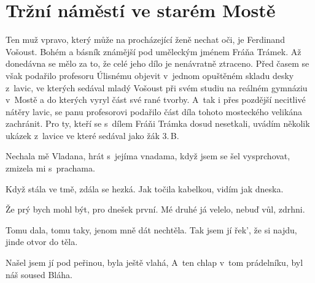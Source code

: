 
\chapter{Tržní náměstí ve starém Mostě}

Ten muž vpravo, který může na procházející ženě nechat oči, je Ferdinand
Vošoust. Bohém a básník známější pod uměleckým jménem Fráňa Trámek. Až
donedávna se mělo za to, že celé jeho dílo je nenávratně ztraceno. Před časem
se však podařilo profesoru Úlisnému objevit v~jednom opuštěném skladu desky
z~lavic, ve kterých sedával mladý Vošoust při svém studiu na reálném gymnáziu
v~Mostě a do kterých vyryl část své rané tvorby. A~tak i přes pozdější
necitlivé nátěry lavic, se panu profesorovi podařilo část díla tohoto
mosteckého velikána zachránit. Pro ty, kteří se s~dílem Fráňi Trámka dosud
nesetkali, uvádím několik ukázek z~lavice ve které sedával jako žák 3.\,B.

\blank[1em]

\no Nechala mě Vladana, \crlf
hrát s~jejíma vnadama, \crlf
když jsem se šel vysprchovat, \crlf
zmizela mi s~prachama. \crlf

\no Když stála ve tmě, \crlf
zdála se hezká. \crlf
Jak točila kabelkou, \crlf
vidím jak dneska. \crlf

\no Že prý bych mohl být, \crlf
pro dnešek první. \crlf
Mé druhé já velelo, \crlf
nebuď vůl, zdrhni. \crlf

\no Tomu dala, tomu taky, \crlf
jenom mně dát nechtěla. \crlf
Tak jsem jí řek', že si najdu, \crlf
jinde otvor do těla. \crlf

\no Našel jsem jí pod peřinou, \crlf
byla ještě vlahá, \crlf
A~ten chlap v~tom prádelníku, \crlf
byl náš soused Bláha.
